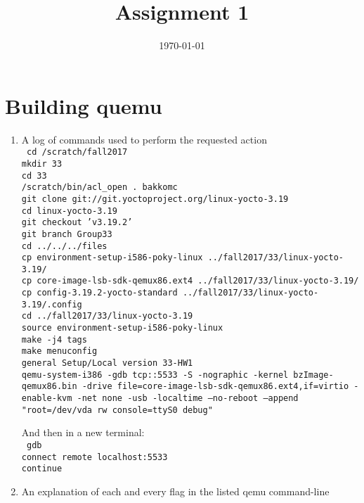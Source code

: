 \documentclass[letterpaper,10pt,titlepage]{article}
\title{Assignment 1}
\author{\name}
\date{\today}
\begin{document}
	\maketitle
	\pagebreak
\section{Building quemu}
	\begin{enumerate}
\item A log of commands used to perform the requested action\\
\texttt{
cd /scratch/fall2017\\
mkdir 33\\
cd 33\\
/scratch/bin/acl\_open . bakkomc\\
git clone git://git.yoctoproject.org/linux-yocto-3.19\\
cd linux-yocto-3.19\\
git checkout 'v3.19.2'\\
git branch Group33\\
cd ../../../files\\
cp environment-setup-i586-poky-linux ../fall2017/33/linux-yocto-3.19/\\
cp core-image-lsb-sdk-qemux86.ext4 ../fall2017/33/linux-yocto-3.19/\\
cp config-3.19.2-yocto-standard ../fall2017/33/linux-yocto-3.19/.config\\
cd ../fall2017/33/linux-yocto-3.19\\
source environment-setup-i586-poky-linux\\
make -j4 tags\\
make menuconfig\\
general Setup/Local version 33-HW1\\
qemu-system-i386 -gdb tcp::5533 -S -nographic -kernel bzImage-qemux86.bin -drive file=core-image-lsb-sdk-qemux86.ext4,if=virtio -enable-kvm -net none -usb -localtime --no-reboot --append "root=/dev/vda rw console=ttyS0 debug"\\
}

And then in a new terminal:\\
\texttt{
gdb\\
connect remote localhost:5533\\
continue\\
}

\item An explanation of each and every flag in the listed qemu command-line\\


\end{enumerate}
\end{document}
